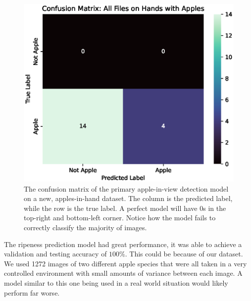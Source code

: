 \begin{figure}[!htb]
    \centering
    \includegraphics[width=\columnwidth,keepaspectratio]
    {./figures/confusion_matrix_All_Files_on_Hands_with_Apples}
    \caption{
        The confusion matrix of the primary apple-in-view detection model on a new, apples-in-hand dataset.
        The column is the predicted label, while the row is the true label.
        A perfect model will have 0s in the top-right and bottom-left corner.
        Notice how the model fails to correctly classify the majority of images.
    }
    \label{fig:apple-in-hand-confusion-matrix}
\end{figure}

The ripeness prediction model had great performance, it was able to achieve a validation and testing accuracy of $100\%$.
This could be because of our dataset. We used 1272 images of two different apple species that were all taken in a very controlled environment with small amounts of variance between each image.
A model similar to this one being used in a real world situation would likely perform far worse.

